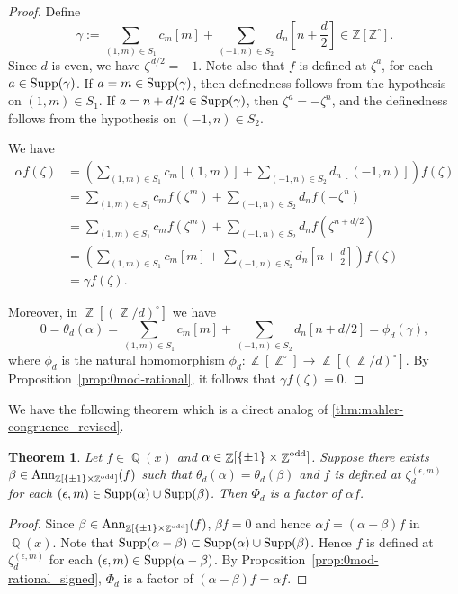 \documentclass[12t,a4paper]{amsart}
\newtheorem{thm}{Theorem}[section]
\theoremstyle{definition}
\DeclareMathOperator{\Z}{\mathbb{Z}}
\DeclareMathOperator{\Q}{\mathbb{Q}}
\DeclareMathOperator{\supp}{{\rm Supp}}
\newcommand{\Ann}{{\rm Ann}}
\newcommand{\odd}{{\rm odd}}
\numberwithin{equation}{section}
\begin{document}
{\begin{proof}
Define
\[
\gamma
:= \sum_{(1,m)\in S_1} c_m [m]
+ \sum_{(-1,n)\in S_2} d_n \left[n + \frac{d}{2}\right]
\in \mathbb{Z}[\mathbb{Z}^{\circ}].
\]
Since \(d\) is even, we have \(\zeta^{\,d/2} = -1\). 
Note also that $f$ is defined at $\zeta^a$, for each $a\in \supp(\gamma)$.  If $a=m\in \supp(\gamma)$, then definedness follows from the hypothesis on $(1,m)\in S_1$. 
If $a=n+d/2\in \supp(\gamma)$, then $\zeta^a =-\zeta^n$, and the definedness follows from the hypothesis on $(-1,n)\in S_2$.

We have
\[
\begin{aligned}
\alpha f(\zeta)
&= \left( \sum_{(1,m)\in S_1} c_m[(1, m)]  +\sum_{(-1,n)\in S_2} d_n [(-1, n)] \right) f(\zeta) \\
&= \sum_{(1,m)\in S_1} c_m f(\zeta^m) +\sum_{(-1,n)\in S_2} d_n f(-\zeta^n)\\
&= \sum_{(1,m)\in S_1} c_m f(\zeta^m)  +\sum_{(-1,n)\in S_2} d_n f(\zeta^{n+d/2}) \\
&= \left( \sum_{(1,m)\in S_1} c_m [m]
+ \sum_{(-1,n)\in S_2} d_n \left[n + \frac{d}{2}\right] \right) f(\zeta) \\
&= \gamma f(\zeta).
\end{aligned}
\]
 
Moreover, in $\Z[(\Z/d)^\circ]$ we have  
\[
0=\theta_d (\alpha) =\sum_{(1,m)\in S_1} c_m [m] +  \sum_{(-1,n)\in S_2} d_n [n+d/2]=\phi_d(\gamma),
\]
where \(\phi_d\) is the natural homomorphism $\phi_d\colon \Z[\Z^\circ]\to \Z[(\Z/d)^\circ]$. 
By Proposition~\ref{prop:0mod-rational}, it follows that \(\gamma f(\zeta) = 0\).
\end{proof}


We have the following theorem which is a direct analog of \cref{thm:mahler-congruence_revised}.

\begin{thm} \label{thm:mahler-congruence_signed}
Let $f\in \Q(x)$ and $\alpha \in \Z[\{\pm 1\}\times\Z^{\odd}]$. Suppose there exists $\beta\in \Ann_{\Z[\{\pm 1\}\times\Z^{\odd}]}(f)$ such that $\theta_d(\alpha)=\theta_d(\beta)$ and $f$ is defined at $\zeta_d^{(\epsilon,m)}$ for each $(\epsilon,m) \in \supp(\alpha)\cup \supp(\beta)$. Then $\Phi_d$ is a factor of $\alpha f$. 
\end{thm}
\begin{proof}
    Since $\beta\in \Ann_{\Z[\{\pm 1\}\times\Z^{\odd}]}(f)$, $\beta f=0$ and hence $\alpha f=(\alpha-\beta )f$ in $\Q(x)$. 
    Note that $\supp(\alpha-\beta)\subset \supp(\alpha)\cup \supp(\beta)$. Hence $f$ is defined at $\zeta_d^{(\epsilon,m)}$ for each $(\epsilon,m) \in \supp(\alpha-\beta)$. By Proposition~\ref{prop:0mod-rational_signed}, $\Phi_d$ is a factor of $(\alpha-\beta )f=\alpha f$.
\end{proof}

}
\end{document}
